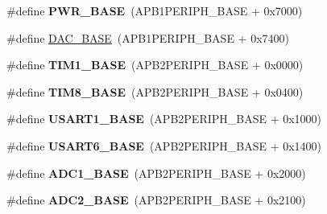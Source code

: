 \begin{DoxyCompactItemize}
\item 
\hypertarget{group___peripheral__memory__map_gac691ec23dace8b7a649a25acb110217a}{\#define {\bfseries P\-W\-R\-\_\-\-B\-A\-S\-E}~(A\-P\-B1\-P\-E\-R\-I\-P\-H\-\_\-\-B\-A\-S\-E + 0x7000)}\label{group___peripheral__memory__map_gac691ec23dace8b7a649a25acb110217a}

\item 
\#define \hyperlink{group___peripheral__memory__map_gad18d0b914c7f68cecbee1a2d23a67d38}{D\-A\-C\-\_\-\-B\-A\-S\-E}~(A\-P\-B1\-P\-E\-R\-I\-P\-H\-\_\-\-B\-A\-S\-E + 0x7400)
\item 
\hypertarget{group___peripheral__memory__map_gaf8aa324ca5011b8173ab16585ed7324a}{\#define {\bfseries T\-I\-M1\-\_\-\-B\-A\-S\-E}~(A\-P\-B2\-P\-E\-R\-I\-P\-H\-\_\-\-B\-A\-S\-E + 0x0000)}\label{group___peripheral__memory__map_gaf8aa324ca5011b8173ab16585ed7324a}

\item 
\hypertarget{group___peripheral__memory__map_ga5b72f698b7a048a6f9fcfe2efe5bc1db}{\#define {\bfseries T\-I\-M8\-\_\-\-B\-A\-S\-E}~(A\-P\-B2\-P\-E\-R\-I\-P\-H\-\_\-\-B\-A\-S\-E + 0x0400)}\label{group___peripheral__memory__map_ga5b72f698b7a048a6f9fcfe2efe5bc1db}

\item 
\hypertarget{group___peripheral__memory__map_ga86162ab3f740db9026c1320d46938b4d}{\#define {\bfseries U\-S\-A\-R\-T1\-\_\-\-B\-A\-S\-E}~(A\-P\-B2\-P\-E\-R\-I\-P\-H\-\_\-\-B\-A\-S\-E + 0x1000)}\label{group___peripheral__memory__map_ga86162ab3f740db9026c1320d46938b4d}

\item 
\hypertarget{group___peripheral__memory__map_gade4d3907fd0387ee832f426f52d568bb}{\#define {\bfseries U\-S\-A\-R\-T6\-\_\-\-B\-A\-S\-E}~(A\-P\-B2\-P\-E\-R\-I\-P\-H\-\_\-\-B\-A\-S\-E + 0x1400)}\label{group___peripheral__memory__map_gade4d3907fd0387ee832f426f52d568bb}

\item 
\hypertarget{group___peripheral__memory__map_ga695c9a2f892363a1c942405c8d351b91}{\#define {\bfseries A\-D\-C1\-\_\-\-B\-A\-S\-E}~(A\-P\-B2\-P\-E\-R\-I\-P\-H\-\_\-\-B\-A\-S\-E + 0x2000)}\label{group___peripheral__memory__map_ga695c9a2f892363a1c942405c8d351b91}

\item 
\hypertarget{group___peripheral__memory__map_ga6544abc57f9759f610eee09a02442ae6}{\#define {\bfseries A\-D\-C2\-\_\-\-B\-A\-S\-E}~(A\-P\-B2\-P\-E\-R\-I\-P\-H\-\_\-\-B\-A\-S\-E + 0x2100)}\label{group___peripheral__memory__map_ga6544abc57f9759f610eee09a02442ae6}


\end{DoxyCompactItemize}

